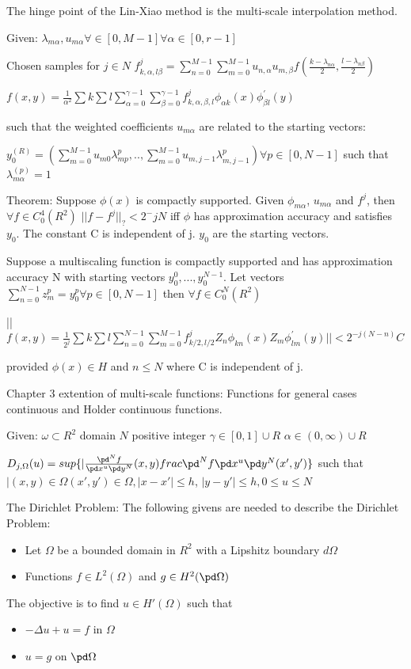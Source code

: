 The hinge point of the Lin-Xiao method is the multi-scale interpolation method.  

Given:
$\lambda _{m\alpha} , u_{m\alpha}   \forall \in [0, M-1] \forall \alpha \in  [0, r-1] $

Chosen samples for $j\in N$ 
$f^j _{k,\alpha, l \beta} = \sum ^{M-1}_{n=0} \sum ^{M-1}_{m=0}  u_{n, \alpha} u_{m, \beta} f ( \frac{k-\lambda _{n\alpha}}{2} , \frac{l-\lambda _{n\beta}}{2} ) $

$f(x,y) = \frac{1}{\alpha ^2}  \sum {k} \sum {l}  \sum ^{\gamma-1}_{\alpha=0} \sum ^{\gamma-1}_{\beta=0}     f^j _{k,\alpha , \beta, l} \phi _{\alpha k} (x) \phi^' _{\beta l} (y) $ 

such that the weighted coefficients $u_{m\alpha} $ are related to the starting vectors:

$y^{(R)}_0 = (\sum ^{M-1}_{m=0} u_{m0} \lambda^p_{mp}, .. , \sum ^{M-1}_{m=0} u_{m, j-1} \lambda^p_{m, j - 1}) \forall p \in [0,N-1]$  such that $\lambda^{(p)}_{m\alpha} = 1$


Theorem: Suppose $\phi(x)$ is compactly supported.  Given $\phi_{m\alpha}$, $u_{m\alpha}$ and $f^j$, then $\forall f\in C^4_0 (R^2)$   $||f-f^j ||_? < 2^-jN $  iff $\phi$ has approximation accuracy and satisfies $y_0$.  The constant C is independent of j.  $y_0$ are the starting vectors.  

Suppose a multiscaling function is compactly supported and has approximation accuracy N with starting vectors $y^0_0, ..., y^{N-1} _0$.  Let vectors $\sum ^{N-1}_{n=0} z_m^p = y^p_0 \forall p \in [0,N-1]$ then $\forall f \in C^N_0 (R^2) $ 

||$f(x,y) = \frac{1}{2^j}  \sum {k} \sum {l}  \sum ^{N-1}_{n=0} \sum ^{M-1}_{m=0}     f^j _{k/2 , l/2} Z_n \phi _{kn} (x) Z_m \phi^' _{lm} (y) || < 2^{-j(N-n)} C $ 

provided $\phi (x) \in H$ and $n\le N$ where C is independent of j.  

Chapter 3 extention of multi-scale functions:  Functions for general cases continuous and Holder continuous functions.  

Given:  $\omega \subset R^2$ domain
$N$  positive integer
$\gamma \in [0,1] \cup R$
$\alpha \in (0, \infty) \cup R$


$D_{j,\Omega} (u) = sup \{| \frac{\pd^N f}{\pd x^u \pd y^N}(x,y) frac{\pd^N f}{\pd x^u \pd y^N}(x',y') \}$
such that 
$|(x,y) \in \Omega (x',y') \in \Omega, |x-x'| \le h$, 
$|y-y'| \le h, 0\le u \le N$


The Dirichlet Problem:
The following givens are needed to describe the Dirichlet Problem:
\begin{itemize}
\item Let $\Omega$ be a bounded domain in $R^2$ with a Lipshitz boundary $d\Omega$ 
\item Functions $f\in L^2 (\Omega)$ and $g\in H^2 (\pd \Omega)$
\end{itemize}
The objective is to find $u\in H'(\Omega)$ such that 
\begin{itemize}
\item $-\Delta u + u = f$ in $\Omega$
\item $u=g$ on $\pd \Omega$
\end{itemize}

